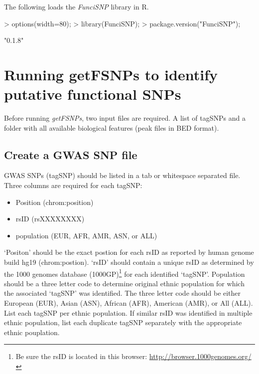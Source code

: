 \documentclass[12pt,fullpage]{article}
\newcommand{\Rpackage}[1]{{\textit{#1}}}
\newcommand{\Rmethod}[1]{{\textit{#1}}}
\begin{document}
The following loads the \Rpackage{FunciSNP} library in R.

\begin{Schunk}
\begin{Sinput}
> options(width=80);
> library(FunciSNP);
> package.version("FunciSNP");
\end{Sinput}
\begin{Soutput}
[1] "0.1.8"
\end{Soutput}
\end{Schunk}

\section{Running getFSNPs to identify putative functional SNPs}

Before running \Rmethod{getFSNPs}, two input files are required. A list of
tagSNPs and a folder with all available biological features (peak files in BED
        format).

\subsection{Create a GWAS SNP file}

GWAS SNPs (tagSNP) should be listed in a tab or whitespace separated file. Three
columns are required for each tagSNP: 

\begin{itemize}
\item Position (chrom:position)
\item rsID (rsXXXXXXXX)
\item population (EUR, AFR, AMR, ASN, or ALL)
\end{itemize}

`Positon' should be the exact postion for each rsID as reported by human genome
build hg19 (chrom:postion). `rsID' should contain a unique rsID as determined by
the 1000 genomes database (1000GP)\footnote{Be sure the rsID is located in this
browser: \url{http://browser.1000genomes.org/}} for each identified `tagSNP'.
Population should be a three letter code to determine original ethnic population
for which the associated `tagSNP' was identified. The three letter code should
be either European (EUR), Asian (ASN), African (AFR), American (AMR), or All
(ALL). List each tagSNP per ethnic population. If similar rsID was identified in
multiple ethnic population, list each duplicate tagSNP separately with the
appropriate ethnic pouplation.
\end{document}
